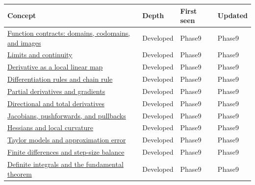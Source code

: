 {\def\LTcaptype{none} %
\begin{longtable}[]{@{}
  >{\raggedright\arraybackslash}p{}
  >{\raggedright\arraybackslash}p{}
  >{\raggedright\arraybackslash}p{}
  >{\raggedright\arraybackslash}p{}@{}}
\toprule\noalign{}
\begin{minipage}[b]{\linewidth}\raggedright
Concept
\end{minipage} & \begin{minipage}[b]{\linewidth}\raggedright
Depth
\end{minipage} & \begin{minipage}[b]{\linewidth}\raggedright
First seen
\end{minipage} & \begin{minipage}[b]{\linewidth}\raggedright
Updated
\end{minipage} \\
\midrule\noalign{}
\endhead
\bottomrule\noalign{}
\endlastfoot
\hyperref[appendix-a59658325cd6]{Function contracts: domains, codomains, and images} & Developed & Phase9 & Phase9 \\
\hyperref[appendix-fecc1847f5a3]{Limits and continuity} & Developed & Phase9 & Phase9 \\
\hyperref[appendix-7bc181935c42]{Derivative as a local linear map} & Developed & Phase9 & Phase9 \\
\hyperref[appendix-d9f70bdfbc92]{Differentiation rules and chain rule} & Developed & Phase9 & Phase9 \\
\hyperref[appendix-677b59746ae0]{Partial derivatives and gradients} & Developed & Phase9 & Phase9 \\
\hyperref[appendix-e2d476574aab]{Directional and total derivatives} & Developed & Phase9 & Phase9 \\
\hyperref[appendix-d8a7ddb675eb]{Jacobians, pushforwards, and pullbacks} & Developed & Phase9 & Phase9 \\
\hyperref[appendix-6ac071f8b50c]{Hessians and local curvature} & Developed & Phase9 & Phase9 \\
\hyperref[appendix-32f39e9a3738]{Taylor models and approximation error} & Developed & Phase9 & Phase9 \\
\hyperref[appendix-e2d7b4f2161d]{Finite differences and step-size balance} & Developed & Phase9 & Phase9 \\
\hyperref[appendix-1a50e72435c2]{Definite integrals and the fundamental theorem} & Developed & Phase9 & Phase9 \\

\end{longtable}}
